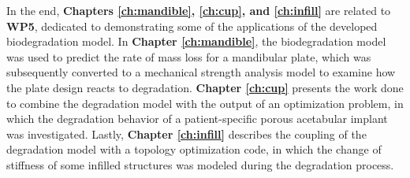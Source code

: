 In the end, \textbf{Chapters \ref{ch:mandible}, \ref{ch:cup}, and \ref{ch:infill}} are related to \textbf{WP5}, dedicated to demonstrating some of the applications of the developed biodegradation model. In \textbf{Chapter \ref{ch:mandible}}, the biodegradation model was used to predict the rate of mass loss for a mandibular plate, which was subsequently converted to a mechanical strength analysis model to examine how the plate design reacts to degradation. \textbf{Chapter \ref{ch:cup}} presents the work done to combine the degradation model with the output of an optimization problem, in which the degradation behavior of a patient-specific porous acetabular implant was investigated. Lastly, \textbf{Chapter \ref{ch:infill}} describes the coupling of the degradation model with a topology optimization code, in which the change of stiffness of some infilled structures was modeled during the degradation process. 

\cleardoublepage


